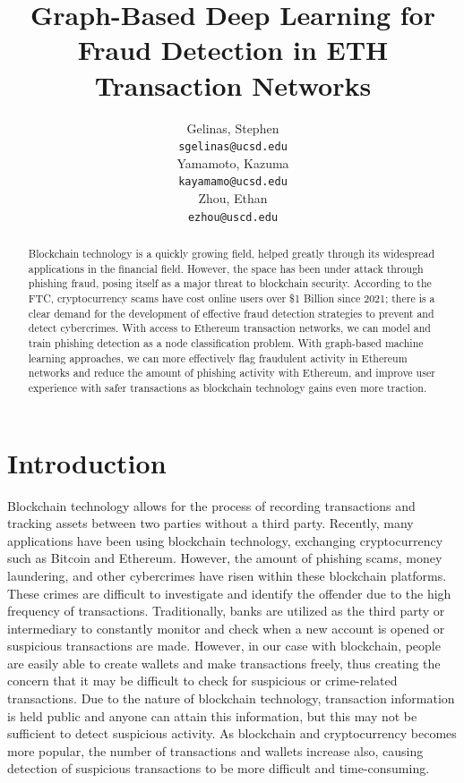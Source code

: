 \documentclass{article}
\title{Graph-Based Deep Learning for Fraud Detection in ETH Transaction Networks}
\author{
  Gelinas, Stephen \\
  \texttt{sgelinas@ucsd.edu} \\
  \And
  Yamamoto, Kazuma \\
   \texttt{kayamamo@ucsd.edu} \\
  \And
  Zhou, Ethan \\
  \texttt{ezhou@uscd.edu} \\
}
\begin{document}
\maketitle

\begin{abstract}
 	Blockchain technology is a quickly growing field, helped greatly through its widespread applications in the financial field. However, the space has been under attack through phishing fraud, posing itself as a major threat to blockchain security. According to the FTC, cryptocurrency scams have cost online users over \$1 Billion since 2021; there is a clear demand for the development of effective fraud detection strategies to prevent and detect cybercrimes. With access to Ethereum transaction networks, we can model and train phishing detection as a node classification problem. With graph-based machine learning approaches, we can more effectively flag fraudulent activity in Ethereum networks and reduce the amount of phishing activity with Ethereum, and improve user experience with safer transactions as blockchain technology gains even more traction.
\end{abstract}


\section{Introduction}
    Blockchain technology allows for the process of recording transactions and tracking assets between two parties without a third party. Recently, many applications have been using blockchain technology, exchanging cryptocurrency such as Bitcoin and Ethereum. However, the amount of phishing scams, money laundering, and other cybercrimes have risen within these blockchain platforms. These crimes are difficult to investigate and identify the offender due to the high frequency of transactions. Traditionally, banks are utilized as the third party or intermediary to constantly monitor and check when a new account is opened or suspicious transactions are made. However, in our case with blockchain, people are easily able to create wallets and make transactions freely, thus creating the concern that it may be difficult to check for suspicious or crime-related transactions. Due to the nature of blockchain technology, transaction information is held public and anyone can attain this information, but this may not be sufficient to detect suspicious activity. As blockchain and cryptocurrency becomes more popular, the number of transactions and wallets increase also, causing detection of suspicious transactions to be more difficult and time-consuming.  
    
\end{document}
